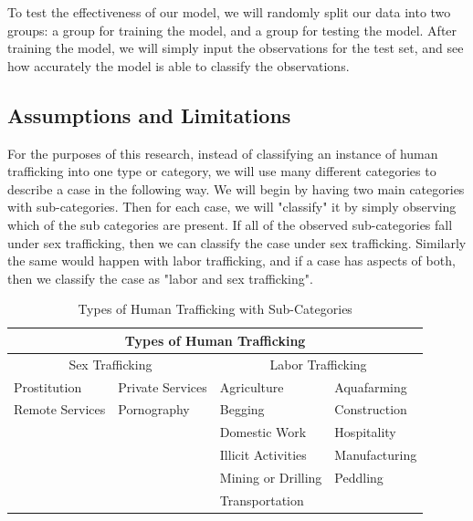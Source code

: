 \documentclass{article} %
\begin{document}
To test the effectiveness of our model, we will randomly split our data into two groups: a group for training the model, and a group for testing the model. After training the model, we will simply input the observations for the test set, and see how accurately the model is able to classify the observations.

\subsection{Assumptions and Limitations}


For the purposes of this research, instead of classifying an instance of human trafficking into one type or category, we will use many different categories to describe a case in the following way. We will begin by having two main categories with sub-categories. Then for each case, we will "classify" it by simply observing which of the sub categories are present. If all of the observed sub-categories fall under sex trafficking, then we can classify the case under sex trafficking. Similarly the same would happen with labor trafficking, and if a case has aspects of both, then we classify the case as "labor and sex trafficking".

\FloatBarrier
\begin{table}[htb]
	\begin{tabular}{ |p{3cm}|p{3cm}||p{3cm}|p{3cm}|  }
		\hline
		\multicolumn{4}{|c|}{Types of Human Trafficking}                                 \\ \hline
		\multicolumn{2}{|c||}{Sex Trafficking} & \multicolumn{2}{|c|}{Labor Trafficking} \\ \hline
		Prostitution    & Private Services     & Agriculture        & Aquafarming        \\
		Remote Services & Pornography          & Begging            & Construction       \\
		&                      & Domestic Work      & Hospitality        \\
		&                      & Illicit Activities & Manufacturing      \\
		&                      & Mining or Drilling & Peddling           \\
		&                      & Transportation     &                    \\ \hline
	\end{tabular}
	\caption{Types of Human Trafficking with Sub-Categories}
\end{table}
\FloatBarrier
\end{document}
